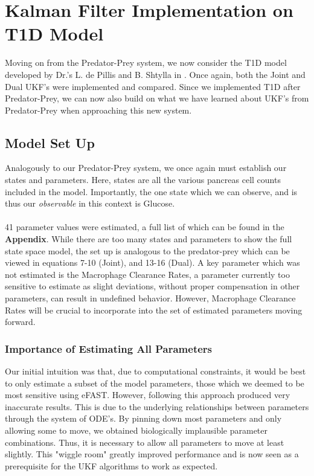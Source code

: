 \documentclass{article}
\begin{document}
\section{Kalman Filter Implementation on T1D Model} \label{section:UKF_T1D_Implementation}
Moving on from the Predator-Prey system, we now consider the T1D model developed by Dr.'s L. de Pillis and B. Shtylla in \cite{shtylla2019mathematical}. Once again, both the Joint and Dual UKF's were implemented and compared. Since we implemented T1D after Predator-Prey, we can now also build on what we have learned about UKF's from Predator-Prey when approaching this new system.

\subsection{Model Set Up}
Analogously to our Predator-Prey system, we once again must establish our states and parameters. Here, states are all the various pancreas cell counts included in the model. Importantly, the one state which we can observe, and is thus our \emph{observable} in this context is Glucose. \\
\\
41 parameter values were estimated, a full list of which can be found in the \textbf{Appendix}. While there are too many states and parameters to show the full state space model, the set up is analogous to the predator-prey which can be viewed in equations 7-10 (Joint), and 13-16 (Dual). A key parameter which was not estimated is the Macrophage Clearance Rates, a parameter currently too sensitive to estimate as slight deviations, without proper compensation in other parameters, can result in undefined behavior. However, Macrophage Clearance Rates will be crucial to incorporate into the set of estimated parameters moving forward.

\subsubsection{Importance of Estimating All Parameters}
Our initial intuition was that, due to computational constraints, it would be best to only estimate a subset of the model parameters, those which we deemed to be most sensitive using eFAST. However, following this approach produced very inaccurate results. This is due to the underlying relationships between parameters through the system of ODE's. By pinning down most parameters and only allowing some to move, we obtained biologically implausible parameter combinations. Thus, it is necessary to allow all parameters to move at least slightly. This "wiggle room" greatly improved performance and is now seen as a prerequisite for the UKF algorithms to work as expected.
\end{document}
